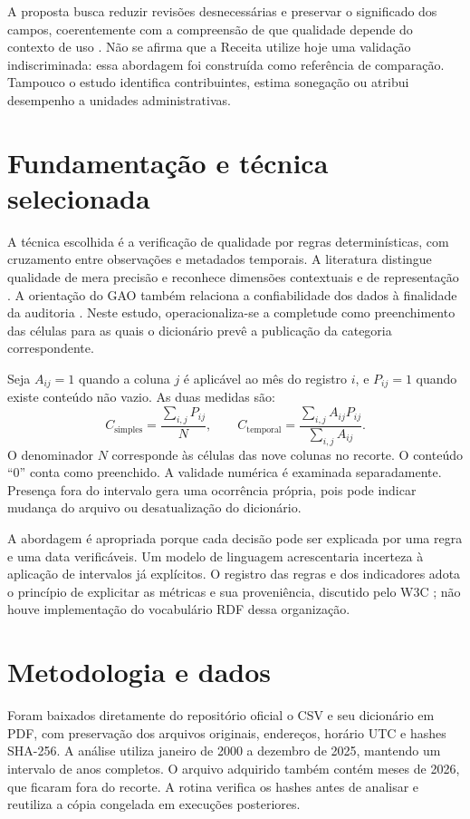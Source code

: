 \documentclass[12pt,a4paper]{article}
\begin{document}
A proposta busca reduzir revisões desnecessárias e preservar o significado
dos campos, coerentemente com a compreensão de que qualidade depende do
contexto de uso \cite{wang1996}. Não se afirma que a Receita utilize hoje uma
validação indiscriminada: essa abordagem foi construída como referência de
comparação. Tampouco o estudo identifica contribuintes, estima sonegação ou
atribui desempenho a unidades administrativas.

\section{Fundamentação e técnica selecionada}
A técnica escolhida é a verificação de qualidade por regras determinísticas,
com cruzamento entre observações e metadados temporais. A literatura distingue
qualidade de mera precisão e reconhece dimensões contextuais e de representação
\cite{wang1996}. A orientação do GAO também relaciona a confiabilidade dos
dados à finalidade da auditoria \cite{gao2019}. Neste estudo, operacionaliza-se
a completude como preenchimento das células para as quais o dicionário prevê
a publicação da categoria correspondente.

Seja $A_{ij}=1$ quando a coluna $j$ é aplicável ao mês do registro $i$, e
$P_{ij}=1$ quando existe conteúdo não vazio. As duas medidas são:
\[
C_{\mathrm{simples}}=\frac{\sum_{i,j}P_{ij}}{N},\qquad
C_{\mathrm{temporal}}=\frac{\sum_{i,j}A_{ij}P_{ij}}{\sum_{i,j}A_{ij}}.
\]
O denominador $N$ corresponde às células das nove colunas no recorte. O conteúdo
``0'' conta como preenchido. A validade numérica é examinada separadamente.
Presença fora do intervalo gera uma ocorrência própria, pois pode indicar
mudança do arquivo ou desatualização do dicionário.

A abordagem é apropriada porque cada decisão pode ser explicada por uma regra
e uma data verificáveis. Um modelo de linguagem acrescentaria incerteza à
aplicação de intervalos já explícitos. O registro das regras e dos indicadores
adota o princípio de explicitar as métricas e sua proveniência, discutido pelo
W3C \cite{w3c2016}; não houve implementação do vocabulário RDF dessa organização.

\section{Metodologia e dados}
Foram baixados diretamente do repositório oficial o CSV e seu dicionário em PDF,
com preservação dos arquivos originais, endereços, horário UTC e hashes SHA-256.
A análise utiliza janeiro de 2000 a dezembro de 2025, mantendo um intervalo de
anos completos. O arquivo adquirido também contém meses de 2026, que ficaram
fora do recorte. A rotina verifica os hashes antes de analisar e reutiliza a
cópia congelada em execuções posteriores.
\end{document}

